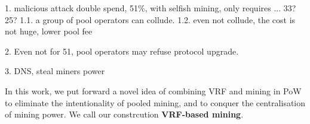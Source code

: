 1. malicious attack
double spend, 51\%, with selfish mining, only requires ... 33?25?
1.1. a group of pool operators can collude.
1.2. even not collude, the cost is not huge, lower pool fee

2. Even not for 51, 
pool operators may refuse protocol upgrade. 


3. DNS, steal miners power


In this work, we put forward a novel idea of combining VRF and mining in PoW to eliminate the intentionality of pooled mining, and to conquer the centralisation of mining power. We call our constrcution \textbf{VRF-based mining}.